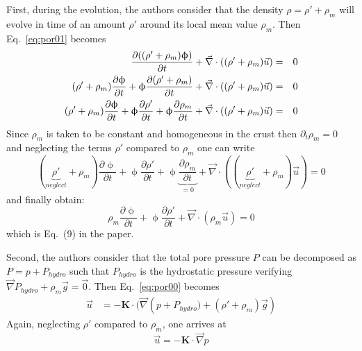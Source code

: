First, during the evolution, the authors consider that the density 
$\rho = \rho' + \rho_m$ will evolve in time of an amount $\rho'$ 
around its local mean value $\rho_m$. Then Eq.~\eqref{eq:por01} becomes
\begin{eqnarray}
\frac{\partial ((\rho'+\rho_m) \upphi)}{\partial t} + \vec\nabla\cdot ((\rho'+\rho_m) \vec{u}) &=& 0 
\nonumber\\
(\rho'+\rho_m) \frac{\partial \upphi}{\partial t} 
+\upphi \frac{\partial (\rho'+\rho_m)}{\partial t} 
+ \vec\nabla\cdot ((\rho'+\rho_m) \vec{u}) &=& 0
\nonumber\\
(\rho' + \rho_m) \frac{\partial \upphi}{\partial t} 
+\upphi \frac{\partial \rho'}{\partial t} 
+\upphi \frac{\partial \rho_m}{\partial t} 
+ \vec\nabla\cdot ((\rho'+\rho_m) \vec{u}) 
&=& 0 \nonumber
\end{eqnarray}
Since $\rho_m$ is taken to be constant and homogeneous in the crust
then $\partial_t \rho_m =0$ %
and neglecting the terms $\rho'$ compared to $\rho_m$ one can write
\begin{equation}
(\underbrace{\rho' }_{neglect} + \rho_m )\frac{\partial \upphi}{\partial t} 
+\upphi \frac{\partial \rho'}{\partial t} 
+\upphi \underbrace{\frac{\partial \rho_m}{\partial t} }_{=0}
+ \vec\nabla\cdot ((\underbrace{\rho'}_{neglect}+\rho_m) \vec{u}) = 0
\end{equation}
and finally obtain:
\begin{equation}
\boxed{
\rho_m \frac{\partial \upphi}{\partial t} 
+\upphi \frac{\partial \rho' }{\partial t} 
+ \vec\nabla\cdot (\rho_m \vec{u}) = 0
}
\label{eq:por10}
\end{equation}
which is Eq.~(9) in the paper.

Second, the authors consider that the total pore pressure $P$ can
be decomposed as $P = p + P_{hydro}$ such that $P_{hydro}$ is the
hydrostatic pressure verifying $\vec\nabla P_{hydro} + \rho_m \vec{g} = \vec{0}$. 
Then Eq.~\eqref{eq:por00} becomes
\begin{align}
\vec{u} &= -{\bm K} \cdot (\vec{\nabla} \left(p + P_{hydro}) + (\rho'+\rho_m) \vec{g} \right) 
\end{align}
Again, neglecting $\rho'$ compared to $\rho_m$, one arrives at
\begin{equation}
\boxed{
\vec{u} = -{\bm K} \cdot \vec{\nabla} p  
}
\label{eq:por21}
\end{equation}

